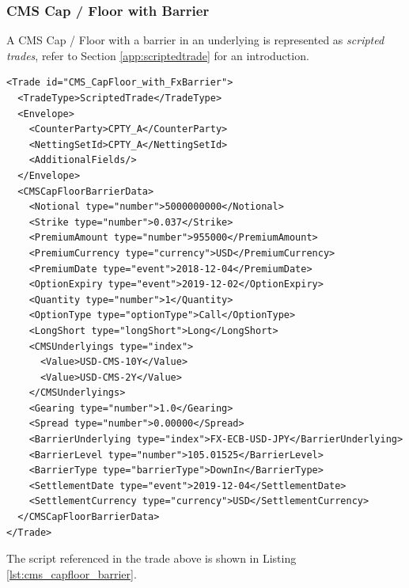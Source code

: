\subsubsection{CMS Cap / Floor with Barrier}


A CMS Cap / Floor with a barrier in an underlying is represented as {\em scripted trades}, refer to Section
\ref{app:scriptedtrade} for an introduction.

\begin{verbatim}
<Trade id="CMS_CapFloor_with_FxBarrier">
  <TradeType>ScriptedTrade</TradeType>
  <Envelope>
    <CounterParty>CPTY_A</CounterParty>
    <NettingSetId>CPTY_A</NettingSetId>
    <AdditionalFields/>
  </Envelope>
  <CMSCapFloorBarrierData>
    <Notional type="number">5000000000</Notional>
    <Strike type="number">0.037</Strike>
    <PremiumAmount type="number">955000</PremiumAmount>
    <PremiumCurrency type="currency">USD</PremiumCurrency>
    <PremiumDate type="event">2018-12-04</PremiumDate>
    <OptionExpiry type="event">2019-12-02</OptionExpiry>
    <Quantity type="number">1</Quantity>
    <OptionType type="optionType">Call</OptionType>
    <LongShort type="longShort">Long</LongShort>
    <CMSUnderlyings type="index">
      <Value>USD-CMS-10Y</Value>
      <Value>USD-CMS-2Y</Value>
    </CMSUnderlyings>
    <Gearing type="number">1.0</Gearing>
    <Spread type="number">0.00000</Spread>
    <BarrierUnderlying type="index">FX-ECB-USD-JPY</BarrierUnderlying>
    <BarrierLevel type="number">105.01525</BarrierLevel>
    <BarrierType type="barrierType">DownIn</BarrierType>
    <SettlementDate type="event">2019-12-04</SettlementDate>
    <SettlementCurrency type="currency">USD</SettlementCurrency>
  </CMSCapFloorBarrierData>
</Trade>
\end{verbatim}

The script referenced in the trade above is shown in Listing \ref{lst:cms_capfloor_barrier}.

